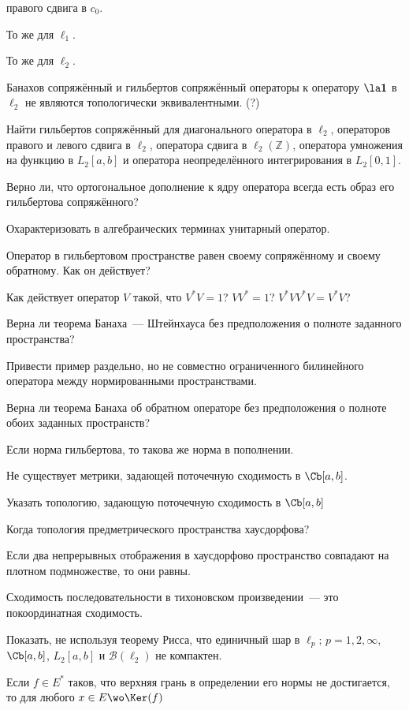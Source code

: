 \documentclass[a4paper]{article}
\begin{document}
\begin{nums}{-1}
правого сдвига в $c_0$.
\item То же для $\ell_1$.
\item То же для $\ell_2$.
\item Банахов сопряжённый и гильбертов сопряжённый операторы к оператору $\la \mathbf{1}$ в $\ell_2$
не являются топологически эквивалентными. (?)
\item Найти гильбертов сопряжённый для диагонального оператора в $\ell_2$, операторов правого и левого сдвига в $\ell_2$,
оператора сдвига в $\ell_2(\mathbb{Z})$, оператора умножения на функцию в $L_2[a,b]$ и оператора неопределённого интегрирования
в $L_2[0,1]$.
\item Верно ли, что ортогональное дополнение к ядру оператора всегда есть образ его гильбертова сопряжённого?
\item Охарактеризовать в алгебраических терминах унитарный оператор.
\item Оператор в гильбертовом пространстве равен своему сопряжённому и своему обратному. Как он действует?
\item Как действует оператор $V$ такой, что $V^*V = 1$? $VV^* = 1$? $V^*VV^*V = V^*V$?
\item Верна ли теорема Банаха~--- Штейнхауса без предположения о полноте заданного пространства?
\item Привести пример раздельно, но не совместно ограниченного билинейного оператора между нормированными пространствами.
\item Верна ли теорема Банаха об обратном операторе без предположения о полноте обоих заданных пространств?
\item Если норма гильбертова, то такова же норма в пополнении.
\item Не существует метрики, задающей поточечную сходимость в $\Cb[a,b]$.
\item Указать топологию, задающую поточечную сходимость в $\Cb[a,b]$
\item Когда топология предметрического пространства хаусдорфова?
\item Если два непрерывных отображения в хаусдорфово пространство совпадают на плотном подмножестве, то они равны.
\item Сходимость последовательности в тихоновском произведении~--- это покоординатная сходимость.
\item Показать, не используя теорему Рисса, что единичный шар в $\ell_p;\,p=1,2,\infty$, $\Cb[a,b]$, $L_2[a,b]$ и
$\mathcal{B}(\ell_2)$ не компактен.
\item Если $f \in E^*$ таков, что верхняя грань в определении его нормы не достигается, то для любого $x \in E \wo \Ker(f)$

\end{nums}
\end{document}
